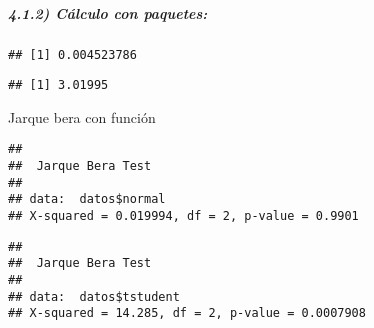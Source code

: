 \documentclass[
]{article}
\newenvironment{Shaded}{\begin{snugshade}}{\end{snugshade}}
\newcommand{\CommentTok}[1]{\textcolor[rgb]{0.56,0.35,0.01}{\textit{#1}}}
\newcommand{\FunctionTok}[1]{\textcolor[rgb]{0.00,0.00,0.00}{#1}}
\newcommand{\NormalTok}[1]{#1}
\newcommand{\SpecialCharTok}[1]{\textcolor[rgb]{0.00,0.00,0.00}{#1}}
\begin{document}
\hypertarget{cuxe1lculo-con-paquetes}{%
\subparagraph{4.1.2) Cálculo con
paquetes:}\label{cuxe1lculo-con-paquetes}}

\begin{Shaded}
\end{Shaded}

\begin{verbatim}
## [1] 0.004523786
\end{verbatim}

\begin{Shaded}
\end{Shaded}

\begin{verbatim}
## [1] 3.01995
\end{verbatim}

Jarque bera con función

\begin{Shaded}
\end{Shaded}

\begin{verbatim}
## 
##  Jarque Bera Test
## 
## data:  datos$normal
## X-squared = 0.019994, df = 2, p-value = 0.9901
\end{verbatim}

\begin{Shaded}
\end{Shaded}

\begin{verbatim}
## 
##  Jarque Bera Test
## 
## data:  datos$tstudent
## X-squared = 14.285, df = 2, p-value = 0.0007908
\end{verbatim}

\begin{Shaded}
\end{Shaded}
\end{document}
